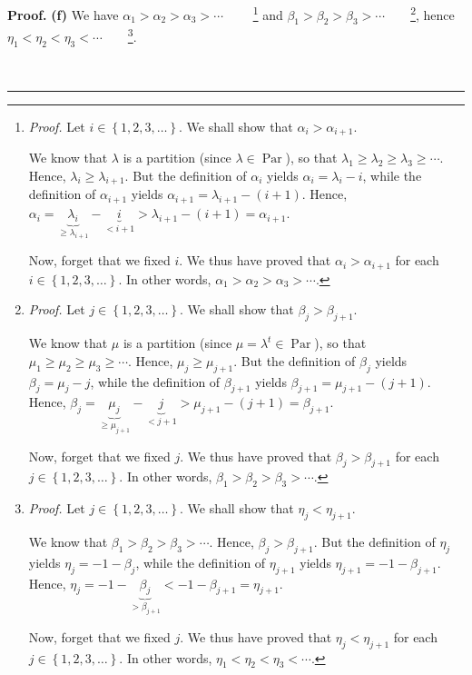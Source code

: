 \documentclass[numbers=enddot,12pt,final,onecolumn,notitlepage]{scrartcl}%
\theoremstyle{definition}
\newenvironment{proof}[1][Proof]{\noindent\textbf{#1.} }{\ \rule{0.5em}{0.5em}}
\newenvironment{verlong}{}{}
\begin{document}
\begin{verlong}
\begin{proof}
\textbf{(f)} We have $\alpha_{1}>\alpha_{2}>\alpha_{3}>\cdots$%
\ \ \ \ \footnote{\textit{Proof.} Let $i\in\left\{  1,2,3,\ldots\right\}  $.
We shall show that $\alpha_{i}>\alpha_{i+1}$.
\par
We know that $\lambda$ is a partition (since $\lambda\in\operatorname*{Par}$),
so that $\lambda_{1}\geq\lambda_{2}\geq\lambda_{3}\geq\cdots$. Hence,
$\lambda_{i}\geq\lambda_{i+1}$. But the definition of $\alpha_{i}$ yields
$\alpha_{i}=\lambda_{i}-i$, while the definition of $\alpha_{i+1}$ yields
$\alpha_{i+1}=\lambda_{i+1}-\left(  i+1\right)  $. Hence, $\alpha
_{i}=\underbrace{\lambda_{i}}_{\geq\lambda_{i+1}}-\underbrace{i}%
_{<i+1}>\lambda_{i+1}-\left(  i+1\right)  =\alpha_{i+1}$.
\par
Now, forget that we fixed $i$. We thus have proved that $\alpha_{i}%
>\alpha_{i+1}$ for each $i\in\left\{  1,2,3,\ldots\right\}  $. In other words,
$\alpha_{1}>\alpha_{2}>\alpha_{3}>\cdots$.} and $\beta_{1}>\beta_{2}>\beta
_{3}>\cdots$\ \ \ \ \footnote{\textit{Proof.} Let $j\in\left\{  1,2,3,\ldots
\right\}  $. We shall show that $\beta_{j}>\beta_{j+1}$.
\par
We know that $\mu$ is a partition (since $\mu=\lambda^{t}\in
\operatorname*{Par}$), so that $\mu_{1}\geq\mu_{2}\geq\mu_{3}\geq\cdots$.
Hence, $\mu_{j}\geq\mu_{j+1}$. But the definition of $\beta_{j}$ yields
$\beta_{j}=\mu_{j}-j$, while the definition of $\beta_{j+1}$ yields
$\beta_{j+1}=\mu_{j+1}-\left(  j+1\right)  $. Hence, $\beta_{j}%
=\underbrace{\mu_{j}}_{\geq\mu_{j+1}}-\underbrace{j}_{<j+1}>\mu_{j+1}-\left(
j+1\right)  =\beta_{j+1}$.
\par
Now, forget that we fixed $j$. We thus have proved that $\beta_{j}>\beta
_{j+1}$ for each $j\in\left\{  1,2,3,\ldots\right\}  $. In other words,
$\beta_{1}>\beta_{2}>\beta_{3}>\cdots$.}, hence $\eta_{1}<\eta_{2}<\eta
_{3}<\cdots$\ \ \ \ \footnote{\textit{Proof.} Let $j\in\left\{  1,2,3,\ldots
\right\}  $. We shall show that $\eta_{j}<\eta_{j+1}$.
\par
We know that $\beta_{1}>\beta_{2}>\beta_{3}>\cdots$. Hence, $\beta_{j}%
>\beta_{j+1}$. But the definition of $\eta_{j}$ yields $\eta_{j}=-1-\beta_{j}%
$, while the definition of $\eta_{j+1}$ yields $\eta_{j+1}=-1-\beta_{j+1}$.
Hence, $\eta_{j}=-1-\underbrace{\beta_{j}}_{>\beta_{j+1}}<-1-\beta_{j+1}%
=\eta_{j+1}$.
\par
Now, forget that we fixed $j$. We thus have proved that $\eta_{j}<\eta_{j+1}$
for each $j\in\left\{  1,2,3,\ldots\right\}  $. In other words, $\eta_{1}%
<\eta_{2}<\eta_{3}<\cdots$.}.


\end{proof}
\end{verlong}
\end{document}
